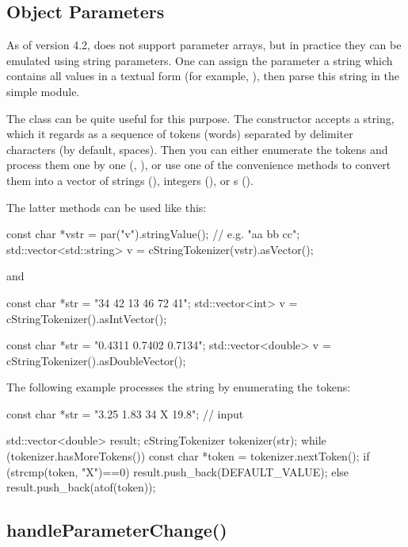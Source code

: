 \subsection{Object Parameters}
\label{sec:simple-modules:object-parameters}

As of version 4.2, {\opp} does not support parameter arrays,
but in practice they can be emulated using string parameters.
One can assign the parameter a string which contains all values
in a textual form (for example, ), then
parse this string in the simple module.

The  class can be quite useful for this
purpose. The constructor accepts a string, which it regards as
a sequence of tokens (words) separated by delimiter characters
(by default, spaces). Then you can either enumerate the tokens
and process them one by one (, ),
or use one of the  convenience methods to convert
them into a vector of strings (), integers (),
or s ().

The latter methods can be used like this:

\begin{cpp}
const char *vstr = par("v").stringValue(); // e.g. "aa bb cc";
std::vector<std::string> v = cStringTokenizer(vstr).asVector();
\end{cpp}

and

\begin{cpp}
const char *str = "34 42 13 46 72 41";
std::vector<int> v = cStringTokenizer().asIntVector();

const char *str = "0.4311 0.7402 0.7134";
std::vector<double> v = cStringTokenizer().asDoubleVector();
\end{cpp}

The following example processes the string by enumerating the tokens:

\begin{cpp}
const char *str = "3.25 1.83 34 X 19.8"; // input

std::vector<double> result;
cStringTokenizer tokenizer(str);
while (tokenizer.hasMoreTokens())
{
    const char *token = tokenizer.nextToken();
    if (strcmp(token, "X")==0)
        result.push_back(DEFAULT_VALUE);
    else
        result.push_back(atof(token));
}
\end{cpp}

\subsection{handleParameterChange()}
\label{sec:simple-modules:handleparameterchange}

